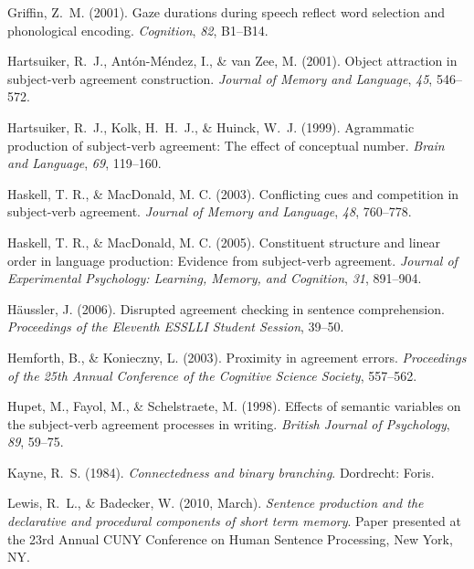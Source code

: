 \documentclass[12pt,titlepage]{article}
\newcommand{\itt}{\textit}  %
\begin{document}
\begin{description}
    \item Griffin, Z.~M\@.  (2001).  Gaze durations during speech reflect
    word selection and phonological encoding.  \itt{Cognition}, \itt{82},
    B1--B14.

    \item Hartsuiker, R.~J., Ant\'{o}n-M\'{e}ndez, I., \& van Zee, M\@.
    (2001).  Object attraction in subject-verb agreement construction.
    \itt{Journal of Memory and Language}, \itt{45}, 546--572.
    
    \item Hartsuiker, R.~J., Kolk, H.~H.~J., \& Huinck, W.~J\@.  (1999).
    Agrammatic production of subject-verb agreement: The effect of
    conceptual number.  \itt{Brain and Language}, \itt{69}, 119--160.
    
    \item Haskell, T. R\@., \& MacDonald, M. C\@.  (2003).  Conflicting
    cues and competition in subject-verb agreement.  \itt{Journal of Memory
    and Language}, \itt{48}, 760--778.
    
    \item Haskell, T. R\@., \& MacDonald, M. C\@.  (2005).  Constituent
    structure and linear order in language production: Evidence from
    subject-verb agreement.  \itt{Journal of Experimental Psychology:
    Learning, Memory, and Cognition}, \itt{31}, 891--904.
    
    \item H\"{a}ussler, J.  (2006).  Disrupted agreement checking in 
    sentence comprehension.  \itt{Proceedings of the Eleventh ESSLLI 
    Student Session}, 39--50.
    
    \item Hemforth, B., \& Konieczny, L. (2003).  Proximity in agreement
    errors.  \itt{Proceedings of the 25th Annual Conference of the
    Cognitive Science Society}, 557--562.
    
    \item Hupet, M., Fayol, M., \& Schelstraete, M\@.  (1998).  Effects of
    semantic variables on the subject-verb agreement processes in writing.
    \itt{British Journal of Psychology}, \itt{89}, 59--75.
    
    \item Kayne, R.~S\@.  (1984).  \itt{Connectedness and binary
    branching}.  Dordrecht: Foris.
    
    \item Lewis, R.~L., \& Badecker, W\@.  (2010, March).  \itt{Sentence
    production and the declarative and procedural components of short term
    memory}.  Paper presented at the 23rd Annual CUNY Conference on Human
    Sentence Processing, New York, NY.


\end{description}
\end{document}
